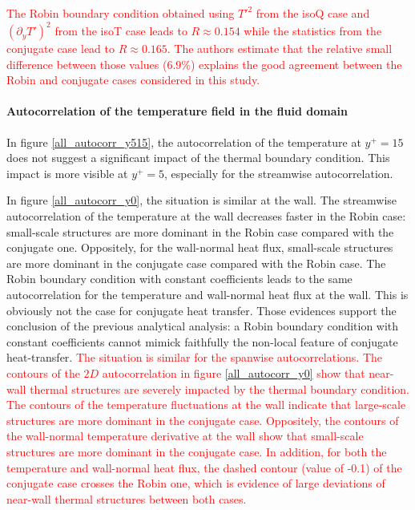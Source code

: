 \documentclass[review]{elsarticle}
\begin{document}
\textcolor{red}{The Robin boundary condition obtained using $T'^2$ from the isoQ case and $\left( \partial_y T' \right)^2$ from the isoT case leads to $R \approx 0.154$ while the statistics from the conjugate case lead to $R \approx 0.165$. The authors estimate that the relative small difference between those values ($6.9\%$) explains the good agreement between the Robin and conjugate cases considered in this study.}


\paragraph{Autocorrelation of the temperature field in the fluid domain}

In figure \ref{all_autocorr_y515}, the autocorrelation of the temperature at $y^+=15$ does not suggest a significant impact of the thermal boundary condition. This impact is more visible at $y^+=5$, especially for the streamwise autocorrelation.

In figure \ref{all_autocorr_y0}, the situation is similar at the wall. The streamwise autocorrelation of the temperature at the wall decreases faster in the Robin case: small-scale structures are more dominant in the Robin case compared with the conjugate one. Oppositely, for the wall-normal heat flux, small-scale structures are more dominant in the conjugate case compared with the Robin case. The Robin boundary condition with constant coefficients leads to the same autocorrelation for the temperature and wall-normal heat flux at the wall. This is obviously not the case for conjugate heat transfer. Those evidences support the conclusion of the previous analytical analysis: a Robin boundary condition with constant coefficients cannot mimick faithfully the non-local feature of conjugate heat-transfer. \textcolor{red}{The situation is similar for the spanwise autocorrelations. The contours of the $2D$ autocorrelation in figure \ref{all_autocorr_y0} show that near-wall thermal structures are severely impacted by the thermal boundary condition. The contours of the temperature fluctuations at the wall indicate that large-scale structures are more dominant in the conjugate case. Oppositely, the contours of the wall-normal temperature derivative at the wall show that small-scale structures are more dominant in the conjugate case. In addition, for both the temperature and wall-normal heat flux, the dashed contour (value of -0.1) of the conjugate case crosses the Robin one, which is evidence of large deviations of near-wall thermal structures between both cases.}
\end{document}
